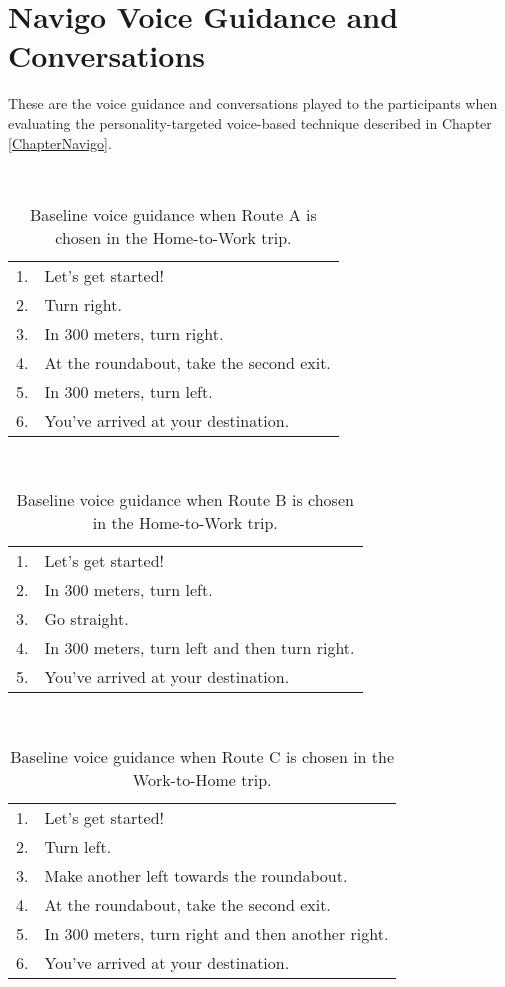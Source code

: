 \chapter{Navigo Voice Guidance and Conversations}
\label{AppendixC}

These are the voice guidance and conversations played to the participants when evaluating the personality-targeted voice-based technique described in Chapter \ref{ChapterNavigo}. 

\begin{table}[h]
\centering
\caption{Baseline voice guidance when Route A is chosen in the Home-to-Work trip.}~\label{tab:c-base-A}
\begin{tabular}{ll}
\hline
1. & Let's get started!                       \\
2. & Turn right.                              \\
3. & In 300 meters, turn right.               \\
4. & At the roundabout, take the second exit. \\
5. & In 300 meters, turn left.                \\
6. & You've arrived at your destination.      \\ \hline
\end{tabular}
\end{table}

\begin{table}[h]
\centering
\caption{Baseline voice guidance when Route B is chosen in the Home-to-Work trip.}~\label{tab:c-base-B}
\begin{tabular}{ll}
\hline
1. & Let's get started!                            \\
2. & In 300 meters, turn left.                     \\
3. & Go straight.                                  \\
4. & In 300 meters, turn left and then turn right. \\
5. & You've arrived at your destination.           \\ \hline
\end{tabular}
\end{table}

\begin{table}[h]
\centering
\caption{Baseline voice guidance when Route C is chosen in the Work-to-Home trip.}~\label{tab:c-base-C}
\begin{tabular}{ll}
\hline
1. & Let's get started!                                \\
2. & Turn left.                                        \\
3. & Make another left towards the roundabout.         \\
4. & At the roundabout, take the second exit.          \\
5. & In 300 meters, turn right and then another right. \\
6. & You've arrived at your destination.               \\ \hline
\end{tabular}
\end{table}

